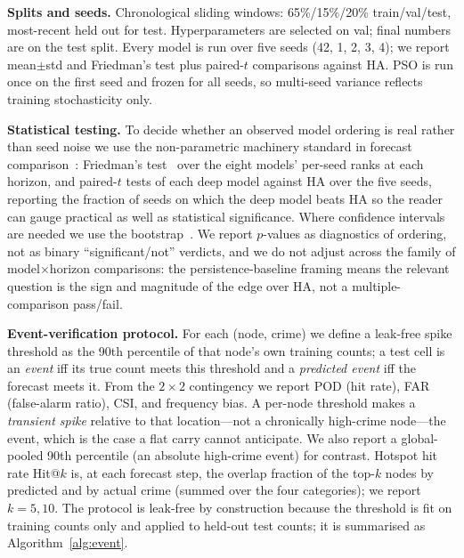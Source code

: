 \documentclass[11pt,conference]{IEEEtran}
\begin{document}
\textbf{Splits and seeds.} Chronological sliding windows:
65\%/15\%/20\% train/val/test, most-recent held out for test. Hyperparameters
are selected on val; final numbers are on the test split. Every model is run
over five seeds (42, 1, 2, 3, 4); we report mean$\pm$std and Friedman's test
plus paired-$t$ comparisons against HA. PSO is run once on the first seed and
frozen for all seeds, so multi-seed variance reflects training stochasticity
only.

\textbf{Statistical testing.} To decide whether an observed model ordering is
real rather than seed noise we use the non-parametric machinery standard in
forecast comparison~\cite{diebold1995comparing}: Friedman's
test~\cite{friedman1937use} over the eight models' per-seed ranks at each
horizon, and paired-$t$ tests of each deep model against HA over the five
seeds, reporting the fraction of seeds on which the deep model beats HA so the
reader can gauge practical as well as statistical significance. Where
confidence intervals are needed we use the
bootstrap~\cite{efron1993bootstrap}. We report $p$-values as diagnostics of
ordering, not as binary ``significant/not'' verdicts, and we do not adjust
across the family of model$\times$horizon comparisons: the persistence-baseline
framing means the relevant question is the sign and magnitude of the edge
over HA, not a multiple-comparison pass/fail.

\textbf{Event-verification protocol.} For each (node, crime) we define a
leak-free spike threshold as the 90th percentile of that node's own training
counts; a test cell is an \emph{event} iff its true count meets this threshold
and a \emph{predicted event} iff the forecast meets it. From the $2{\times}2$
contingency we report POD (hit rate), FAR (false-alarm ratio), CSI, and
frequency bias. A per-node threshold makes a \emph{transient spike} relative
to that location---not a chronically high-crime node---the event, which is the
case a flat carry cannot anticipate. We also report a global-pooled 90th
percentile (an absolute high-crime event) for contrast. Hotspot hit rate
Hit@$k$ is, at each forecast step, the overlap fraction of the top-$k$ nodes
by predicted and by actual crime (summed over the four categories); we report
$k{=}5,10$. The protocol is leak-free by construction because the threshold is
fit on training counts only and applied to held-out test counts; it is
summarised as Algorithm~\ref{alg:event}.
\end{document}
